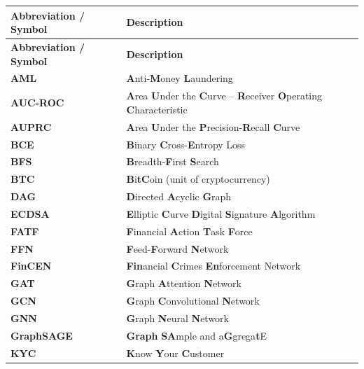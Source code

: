 \clearpage %
\begin{glossarylist}


\begin{longtable}{@{} l p{9.2cm} @{}}
\toprule
\textbf{Abbreviation / Symbol} & \textbf{Description} \\
\midrule
\endfirsthead

\toprule
\textbf{Abbreviation / Symbol} & \textbf{Description} \\
\midrule
\endhead

\bottomrule
\endfoot

\bottomrule
\endlastfoot

\textbf{AML} & \textbf{A}nti-\textbf{M}oney \textbf{L}aundering \\
\textbf{AUC-ROC} & \textbf{A}rea \textbf{U}nder the \textbf{C}urve -- \textbf{R}eceiver \textbf{O}perating \textbf{C}haracteristic \\
\textbf{AUPRC} & \textbf{A}rea \textbf{U}nder the \textbf{P}recision-\textbf{R}ecall \textbf{C}urve \\
\textbf{BCE} & \textbf{B}inary \textbf{C}ross-\textbf{E}ntropy Loss \\
\textbf{BFS} & \textbf{B}readth-\textbf{F}irst \textbf{S}earch \\
\textbf{BTC} & \textbf{B}i\textbf{t}\textbf{C}oin (unit of cryptocurrency) \\
\textbf{DAG} & \textbf{D}irected \textbf{A}cyclic \textbf{G}raph \\
\textbf{ECDSA} & \textbf{E}lliptic \textbf{C}urve \textbf{D}igital \textbf{S}ignature \textbf{A}lgorithm \\
\textbf{FATF} & \textbf{F}inancial \textbf{A}ction \textbf{T}ask \textbf{F}orce \\
\textbf{FFN} & \textbf{F}eed-\textbf{F}orward \textbf{N}etwork \\
\textbf{FinCEN} & \textbf{Fin}ancial \textbf{C}rimes \textbf{En}forcement Network \\
\textbf{GAT} & \textbf{G}raph \textbf{A}ttention \textbf{N}etwork \\
\textbf{GCN} & \textbf{G}raph \textbf{C}onvolutional \textbf{N}etwork \\
\textbf{GNN} & \textbf{G}raph \textbf{N}eural \textbf{N}etwork \\
\textbf{GraphSAGE} & \textbf{Graph} \textbf{SA}mple and a\textbf{G}grega\textbf{t}E \\
\textbf{KYC} & \textbf{K}now \textbf{Y}our \textbf{C}ustomer \\

\end{longtable}
\end{glossarylist}
